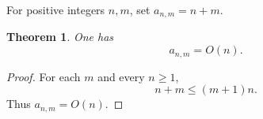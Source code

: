 \documentclass{article}
\newtheorem{theorem}{Theorem}
\begin{document}
For positive integers $n,m$, set $a_{n,m}=n+m$.

\begin{theorem}\label{thm:ambiguous-big-o}
One has
\[
  a_{n,m}=O(n).
\]
\end{theorem}
\begin{proof}
For each $m$ and every $n\ge1$,
\[
  n+m\le (m+1)n.
\]
Thus $a_{n,m}=O(n)$.
\end{proof}
\end{document}
